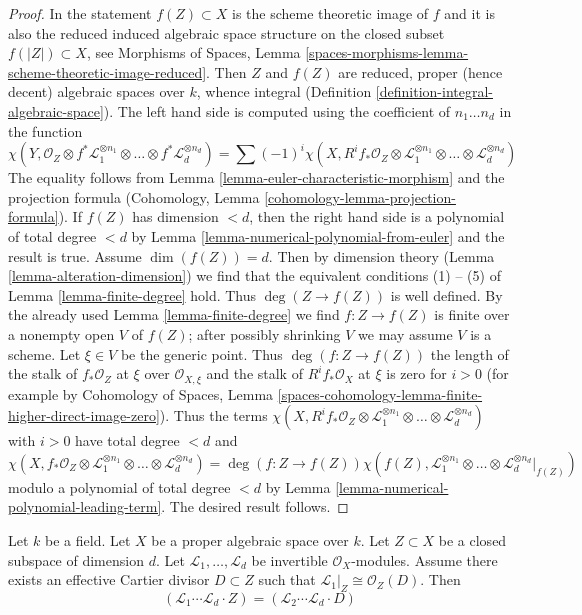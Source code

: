 \begin{proof}
In the statement $f(Z) \subset X$ is the scheme theoretic image of $f$
and it is also the reduced induced algebraic space structure on the
closed subset $f(|Z|) \subset X$, see Morphisms of Spaces, Lemma
\ref{spaces-morphisms-lemma-scheme-theoretic-image-reduced}.
Then $Z$ and $f(Z)$ are reduced, proper (hence decent) algebraic spaces
over $k$, whence integral
(Definition \ref{definition-integral-algebraic-space}).
The left hand side is computed using the coefficient of $n_1 \ldots n_d$
in the function
$$
\chi(Y, \mathcal{O}_Z \otimes f^*\mathcal{L}_1^{\otimes n_1} \otimes
\ldots \otimes f^*\mathcal{L}_d^{\otimes n_d}) =
\sum (-1)^i
\chi(X, R^if_*\mathcal{O}_Z \otimes
\mathcal{L}_1^{\otimes n_1} \otimes \ldots \otimes
\mathcal{L}_d^{\otimes n_d})
$$
The equality follows from Lemma \ref{lemma-euler-characteristic-morphism}
and the projection formula
(Cohomology, Lemma \ref{cohomology-lemma-projection-formula}).
If $f(Z)$ has dimension $< d$, then the right hand side
is a polynomial of total degree $< d$ by
Lemma \ref{lemma-numerical-polynomial-from-euler}
and the result is true. Assume $\dim(f(Z)) = d$. Then
by dimension theory (Lemma \ref{lemma-alteration-dimension})
we find that the equivalent conditions (1) -- (5) of
Lemma \ref{lemma-finite-degree} hold. Thus
$\deg(Z \to f(Z))$ is well defined.
By the already used Lemma \ref{lemma-finite-degree}
we find $f : Z \to f(Z)$ is finite over a nonempty open
$V$ of $f(Z)$; after possibly shrinking $V$ we may assume
$V$ is a scheme. Let $\xi \in V$ be the generic point.
Thus $\deg(f : Z \to f(Z))$ the length of the stalk of
$f_*\mathcal{O}_Z$ at $\xi$ over $\mathcal{O}_{X, \xi}$
and the stalk of $R^if_*\mathcal{O}_X$ at $\xi$ is zero for $i > 0$
(for example by Cohomology of Spaces, Lemma
\ref{spaces-cohomology-lemma-finite-higher-direct-image-zero}).
Thus the terms $\chi(X, R^if_*\mathcal{O}_Z \otimes
\mathcal{L}_1^{\otimes n_1} \otimes \ldots \otimes
\mathcal{L}_d^{\otimes n_d})$ with $i > 0$ have total
degree $< d$ and
$$
\chi(X, f_*\mathcal{O}_Z \otimes
\mathcal{L}_1^{\otimes n_1} \otimes \ldots \otimes
\mathcal{L}_d^{\otimes n_d})
=
\deg(f : Z \to f(Z)) \chi(f(Z),
\mathcal{L}_1^{\otimes n_1} \otimes \ldots \otimes
\mathcal{L}_d^{\otimes n_d}|_{f(Z)})
$$
modulo a polynomial of total degree $< d$ by
Lemma \ref{lemma-numerical-polynomial-leading-term}.
The desired result follows.
\end{proof}

\begin{lemma}
\label{lemma-numerical-intersection-effective-Cartier-divisor}
Let $k$ be a field. Let $X$ be a proper algebraic space over $k$.
Let $Z \subset X$ be a closed subspace of dimension $d$.
Let $\mathcal{L}_1, \ldots, \mathcal{L}_d$
be invertible $\mathcal{O}_X$-modules. Assume there exists an
effective Cartier divisor $D \subset Z$ such that
$\mathcal{L}_1|_Z \cong \mathcal{O}_Z(D)$. Then
$$
(\mathcal{L}_1 \cdots \mathcal{L}_d \cdot Z) =
(\mathcal{L}_2 \cdots \mathcal{L}_d \cdot D)
$$
\end{lemma}

